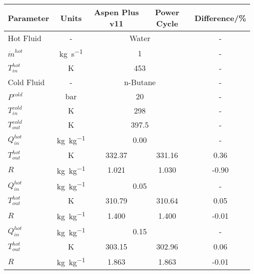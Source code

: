 \begin{tabular}{|p{2.5cm} c c c c|}
    \hline
    \rowcolor{bluepoli!40} %
    \textbf{Parameter} & \textbf{Units} & \textbf{Aspen Plus v11} & \textbf{Power Cycle} & \textbf{Difference/\unit{\percent}} \T\B \\
    \hline \hline
    Hot Fluid & - & \multicolumn{2}{c}{Water} & - \T\B\\
    \(\Dot{m}^{hot}\) & \unit{\kg\per\s} & \multicolumn{2}{c}{\num{1}} & - \T\B\\
    \(T_{in}^{hot}\) & \unit{\K} & \multicolumn{2}{c}{\num{453}} & - \T\B\\
    \hline
    Cold Fluid & - & \multicolumn{2}{c}{n-Butane} & - \T\B\\
    \(P^{cold}\) & \unit{\bar} & \multicolumn{2}{c}{\num{20}} & - \T\B\\
    \(T_{in}^{cold}\) & \unit{\K} & \multicolumn{2}{c}{\num{298}} & - \T\B\\
    \(T_{out}^{cold}\) & \unit{\K} & \multicolumn{2}{c}{\num{397.5}} & - \T\B\\
    \hline\hline
    \(Q_{in}^{hot}\) & \unit{\kg\per\kg} & \multicolumn{2}{c}{\num{0.00}} & - \T\B\\
    \hline
    \(T_{out}^{hot}\) & \unit{\K} & 332.37 & 331.16 & 0.36 \T\B\\
    \(R\) & \unit{\kg\per\kg} & 1.021 & 1.030 & -0.90 \T\B\\
    \hline \hline
    \(Q_{in}^{hot}\) & \unit{\kg\per\kg} & \multicolumn{2}{c}{\num{0.05}} & - \T\B\\
    \hline
    \(T_{out}^{hot}\) & \unit{\K} & 310.79 & 310.64 & 0.05 \T\B\\
    \(R\) & \unit{\kg\per\kg} & 1.400 & 1.400 & -0.01 \T\B\\
    \hline \hline
    \(Q_{in}^{hot}\) & \unit{\kg\per\kg} & \multicolumn{2}{c}{\num{0.15}} & - \T\B\\
    \hline
    \(T_{out}^{hot}\) & \unit{\K} & 303.15 & 302.96 & 0.06 \T\B\\
    \(R\) & \unit{\kg\per\kg} & 1.863 & 1.863 & -0.01 \T\B\\
    \hline
\end{tabular}